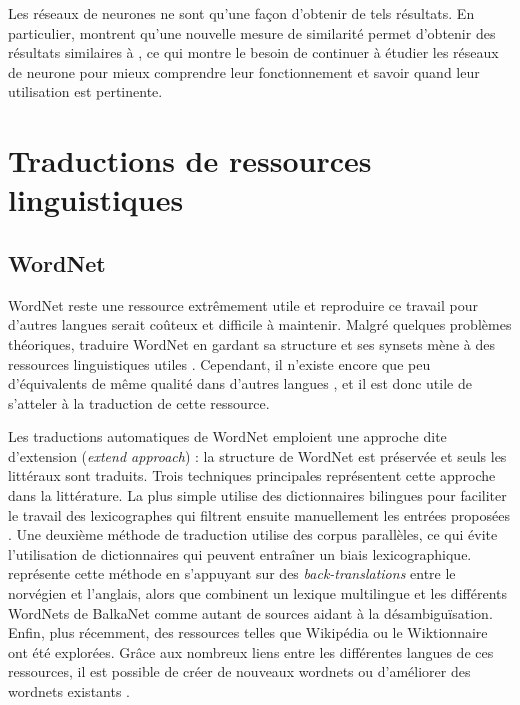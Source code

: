 
Les réseaux de neurones ne sont qu'une façon d'obtenir de tels résultats. En
particulier, \cite{levy2014linguistic} montrent qu'une nouvelle mesure de
similarité permet d'obtenir des résultats similaires à
\cite{mikolov2013efficient}, ce qui montre le besoin de continuer à étudier les
réseaux de neurone pour mieux comprendre leur fonctionnement et savoir quand
leur utilisation est pertinente.

\section{Traductions de ressources linguistiques}
\label{sec:translation}

\subsection{WordNet}

WordNet reste une ressource extrêmement utile et reproduire ce travail pour
d'autres langues serait coûteux et difficile à maintenir. Malgré quelques
problèmes théoriques, traduire WordNet en gardant sa structure et ses synsets
mène à des ressources linguistiques utiles
\citep{fellbaum2007connecting,demelo2008utility}. Cependant, il n'existe encore
que peu d'équivalents de même qualité dans d'autres langues
\citep{bond2012survey}, et il est donc utile de s'atteler à la traduction de
cette ressource.

Les traductions automatiques de WordNet emploient une approche dite d'extension
(\textit{extend approach}) : la structure de WordNet est préservée et seuls les
littéraux sont traduits. Trois techniques principales représentent cette
approche dans la littérature. La plus simple utilise des dictionnaires
bilingues pour faciliter le travail des lexicographes qui filtrent ensuite
manuellement les entrées proposées
\citep{vossen1998eurowordnet,pianta2002developing,tufis2004balkanet}. Une
deuxième méthode de traduction utilise des corpus parallèles, ce qui évite
l'utilisation de dictionnaires qui peuvent entraîner un biais lexicographique.
\cite{dyvik2004translations} représente cette méthode en s'appuyant sur des
\textit{back-translations} entre le norvégien et l'anglais, alors que
\citep{sagot2008construction} combinent un lexique multilingue et les
différents WordNets de BalkaNet comme autant de sources aidant à la
désambiguïsation. Enfin, plus récemment, des ressources telles que Wikipédia ou
le Wiktionnaire ont été explorées. Grâce aux nombreux liens entre les
différentes langues de ces ressources, il est possible de créer de nouveaux
wordnets \citep{demelo2009towards,navigli2010babelnet} ou d'améliorer des
wordnets existants \citep{hanoka2012wordnet}.

